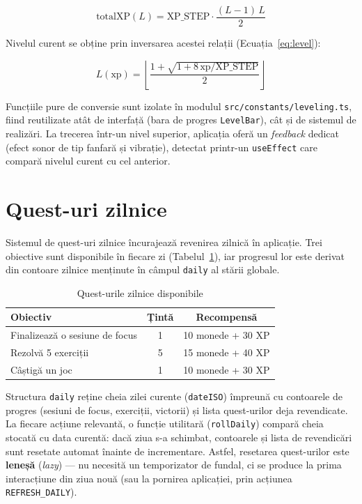 \documentclass[12pt, a4paper, twoside]{report}
\numberwithin{equation}{section}
\begin{document}
\begin{equation}
  \text{totalXP}(L) = \text{XP\_STEP} \cdot \frac{(L-1)\,L}{2}
  \label{eq:xp}
\end{equation}

Nivelul curent se obține prin inversarea acestei relații (Ecuația~\ref{eq:level}):

\begin{equation}
  L(\text{xp}) = \left\lfloor \frac{1 + \sqrt{1 + 8\,\text{xp}/\text{XP\_STEP}}}{2} \right\rfloor
  \label{eq:level}
\end{equation}

Funcțiile pure de conversie sunt izolate în modulul \texttt{src/constants/leveling.ts}, fiind
reutilizate atât de interfață (bara de progres \texttt{LevelBar}), cât și de sistemul de
realizări. La trecerea într-un nivel superior, aplicația oferă un \textit{feedback} dedicat
(efect sonor de tip fanfară și vibrație), detectat printr-un \texttt{useEffect} care compară
nivelul curent cu cel anterior.

\section{Quest-uri zilnice}
\label{sec:quests}

Sistemul de quest-uri zilnice încurajează revenirea zilnică în aplicație. Trei obiective
sunt disponibile în fiecare zi (Tabelul~\ref{tab:quests}), iar progresul lor este derivat
din contoare zilnice menținute în câmpul \texttt{daily} al stării globale.

\begin{table}[H]
\centering
\caption{Quest-urile zilnice disponibile}
\label{tab:quests}
\begin{tabular}{lcc}
\toprule
\textbf{Obiectiv} & \textbf{Țintă} & \textbf{Recompensă} \\
\midrule
Finalizează o sesiune de focus & 1 & 10 monede + 30 XP \\
Rezolvă 5 exerciții & 5 & 15 monede + 40 XP \\
Câștigă un joc & 1 & 10 monede + 30 XP \\
\bottomrule
\end{tabular}
\end{table}

Structura \texttt{daily} reține cheia zilei curente (\texttt{dateISO}) împreună cu contoarele
de progres (sesiuni de focus, exerciții, victorii) și lista quest-urilor deja revendicate.
La fiecare acțiune relevantă, o funcție utilitară (\texttt{rollDaily}) compară cheia stocată
cu data curentă: dacă ziua s-a schimbat, contoarele și lista de revendicări sunt resetate
automat înainte de incrementare. Astfel, resetarea quest-urilor este \textbf{leneșă}
(\textit{lazy}) — nu necesită un temporizator de fundal, ci se produce la prima interacțiune
din ziua nouă (sau la pornirea aplicației, prin acțiunea \texttt{REFRESH\_DAILY}).
\end{document}
